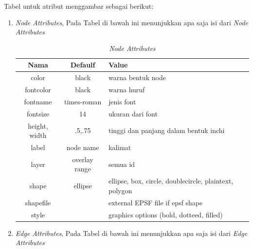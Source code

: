 \begin{enumerate}
Tabel untuk atribut menggambar sebagai berikut:
\begin{enumerate}
\item \textit{Node Attributes}, Pada Tabel di bawah ini menunjukkan apa saja isi dari \textit{Node Attributes}
\begin{table}[htbp]
\begin{center}
\caption{\textit{Node Attributes}}
\begin{tabular}{|c|c|l|}
\hline
  Nama & Defaulf & Value \\
\hline
  color & black & warna bentuk node \\
  fontcolor & black & warna huruf \\
  fontname & times-roman & jenis font \\
  fontsize & 14 & ukuran dari font \\
  height, width & .5,.75 & tinggi dan panjang dalam bentuk inchi \\
  label & node name & kalimat \\
  layer & overlay range & semua id \\
  shape & ellipse & ellipse, box, circle, doublecircle, plaintext, polygon \\
  shapefile & & external EPSF file if epsf shape \\
  style & & graphics options (bold, dotteed, filled)\\
\hline
\end{tabular}
\end{center}
\end{table}

\item \textit{Edge Attributes}, Pada Tabel di bawah ini menunjukkan apa saja isi dari \textit{Edge Attributes} \\


\end{enumerate}
\end{enumerate}
